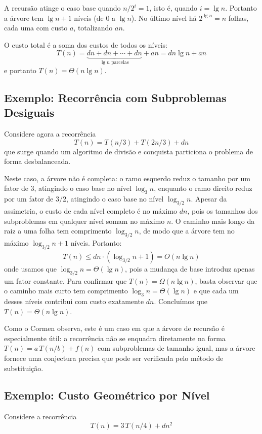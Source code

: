 \documentclass[9pt,a4paper]{extarticle}
\begin{document}
\noindent A recursão atinge o caso base quando $n/2^i = 1$, isto é, quando $i = \lg n$. Portanto a árvore tem $\lg n + 1$ níveis (de $0$ a $\lg n$). No último nível há $2^{\lg n} = n$ folhas, cada uma com custo $a$, totalizando $an$.

O custo total é a soma dos custos de todos os níveis:
%
\[
T(n) = \underbrace{dn + dn + \cdots + dn}_{\lg n \text{ parcelas}} + an = dn\lg n + an
\]
%
\noindent e portanto $T(n) = \Theta(n \lg n)$.

\subsection{Exemplo: Recorrência com Subproblemas Desiguais}

Considere agora a recorrência
%
\[
T(n) = T(n/3) + T(2n/3) + dn
\]
%
\noindent que surge quando um algoritmo de divisão e conquista particiona o problema de forma desbalanceada.

Neste caso, a árvore não é completa: o ramo esquerdo reduz o tamanho por um fator de $3$, atingindo o caso base no nível $\log_3 n$, enquanto o ramo direito reduz por um fator de $3/2$, atingindo o caso base no nível $\log_{3/2} n$. Apesar da assimetria, o custo de cada nível completo é no máximo $dn$, pois os tamanhos dos subproblemas em qualquer nível somam no máximo $n$. O caminho mais longo da raiz a uma folha tem comprimento $\log_{3/2} n$, de modo que a árvore tem no máximo $\log_{3/2} n + 1$ níveis. Portanto:
%
\[
T(n) \leq dn \cdot (\log_{3/2} n + 1) = O(n \lg n)
\]
%
\noindent onde usamos que $\log_{3/2} n = \Theta(\lg n)$, pois a mudança de base introduz apenas um fator constante. Para confirmar que $T(n) = \Omega(n \lg n)$, basta observar que o caminho mais curto tem comprimento $\log_3 n = \Theta(\lg n)$ e que cada um desses níveis contribui com custo exatamente $dn$. Concluímos que $T(n) = \Theta(n \lg n)$.

Como o Cormen observa, este é um caso em que a árvore de recursão é especialmente útil: a recorrência não se enquadra diretamente na forma $T(n) = a\,T(n/b) + f(n)$ com subproblemas de tamanho igual, mas a árvore fornece uma conjectura precisa que pode ser verificada pelo método de substituição.

\subsection{Exemplo: Custo Geométrico por Nível}

Considere a recorrência
%
\[
T(n) = 3\,T(n/4) + dn^2
\]
\end{document}
